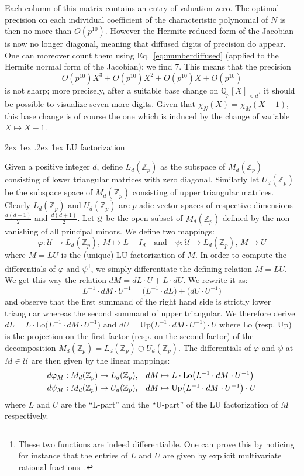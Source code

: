 \documentclass[11pt]{article}
\makeatletter
\numberwithin{equation}{section}
\numberwithin{figure}{section}
\renewcommand\paragraph{\@startsection{paragraph}{4}{\z@}%
                                    {2ex \@plus1ex \@minus.2ex}%
                                    {1ex}%
                                    {\normalfont\normalsize\bfseries}}
\theoremstyle{definition}
\newcommand{\Z}{\mathbb Z}
\newcommand{\Zp}{\Z_p}
\newcommand{\Q}{\mathbb Q}
\newcommand{\Qp}{\Q_p}
\newcommand{\calU}{\mathcal U}
\makeatother
\begin{document}
%
Each column of this matrix contains an entry of valuation zero. The 
optimal precision on each individual coefficient of the characteristic 
polynomial of $N$ is then no more than $O(p^{10})$. However the Hermite 
reduced form of the Jacobian is now no longer diagonal, meaning that 
diffused digits of precision do appear. One can moreover count them 
using Eq.~\eqref{eq:numberdiffused} (applied to the Hermite normal
form of the Jacobian): we find $7$. This means that the precision
$$O(p^{10}) X^3 + O(p^{10}) X^2 + O(p^{10}) X + O(p^{10})$$
is not sharp; more precisely, after a suitable base change on $\Qp[X]_{< 
d}$, it should be possible to visualize seven more digits. 
Given that $\chi_N(X) = \chi_M(X{-}1)$, this base change is of course
the one which is induced by the change of variable $X \mapsto X{-}1$.

\paragraph{LU factorization}

Given a positive integer $d$, define $L_d(\Zp)$ as the subspace of 
$M_d(\Zp)$ consisting of lower triangular matrices with zero diagonal.
Similarly let $U_d(\Zp)$ be the subspace space of $M_d(\Zp)$ 
consisting of upper triangular matrices. Clearly $L_d(\Zp)$ and 
$U_d(\Zp)$ are $p$-adic vector spaces of respective dimensions 
$\frac{d(d{-}1)}2$ and $\frac{d(d{+}1)}2$. Let $\calU$ be the open 
subset of $M_d(\Zp)$ defined by the non-vanishing of all principal 
minors. We define two mappings:
$$\varphi : \calU \to L_d(\Zp), \, M \mapsto L{-}I_d 
\quad \text{and} \quad 
\psi : \calU \to L_d(\Zp), \, M \mapsto U$$
where $M = LU$ is the (unique) LU factorization of $M$.
In order to compute the differentials of $\varphi$ and 
$\psi$\footnote{These two functions are indeed differentiable. One can 
prove this by noticing for instance that the entries of $L$ and $U$ are 
given by explicit multivariate rational fractions~\cite[\S 1.4]{Ho75}.}, we
simply differentiate the defining relation $M = LU$. We get this
way the relation $dM = dL \cdot U + L \cdot dU$. We rewrite it as:
$$L^{-1} \cdot dM \cdot U^{-1} = 
\big(L^{-1} \cdot dL\big) + \big(dU \cdot U^{-1}\big)$$
and observe that the first summand of the right hand side is strictly lower 
triangular whereas the second summand of upper triangular. We
therefore derive
$dL = L \cdot \text{Lo}\big(L^{-1} \cdot dM \cdot U^{-1}\big)$ and
$dU = \text{Up}\big(L^{-1} \cdot dM \cdot U^{-1}\big) \cdot U$
where $\text{Lo}$ (resp. $\text{Up}$) is the projection on the first
factor (resp. on the second factor) of the decomposition $M_d(\Zp)
= L_d(\Zp) \oplus U_d(\Zp)$. 
The differentials of $\varphi$ and $\psi$ at $M \in \calU$ are 
then given by the linear mappings:
$$\begin{array}{rl}
d \varphi_M : M_d(\Zp) \to L_d(\Zp), &
dM \mapsto L \cdot \text{Lo}\big(L^{-1} \cdot dM \cdot U^{-1}\big) \smallskip \\
d \psi_M : M_d(\Zp) \to U_d(\Zp), &
dM \mapsto \text{Up}\big(L^{-1} \cdot dM \cdot U^{-1}\big) \cdot U 
\end{array}$$
where $L$ and $U$ are the ``L-part'' and the ``U-part'' of the LU 
factorization of $M$ respectively.
\end{document}
